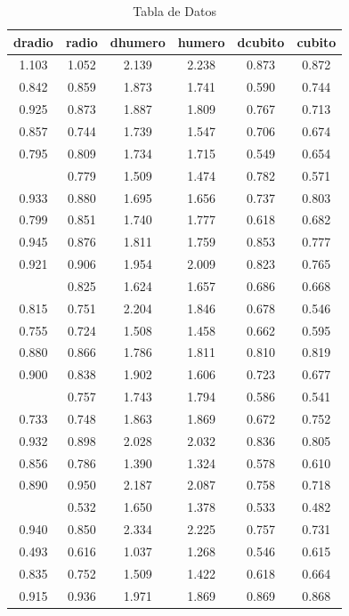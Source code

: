 \documentclass[12pt,a4paper,]{book}
\numberwithin{dummy}{section}
\theoremstyle{ocrenumbox}
\theoremstyle{ocrenumbox}
\theoremstyle{ocrenumbox}
\theoremstyle{ocrenumbox}
\theoremstyle{ocrenum}
\begin{document}
\begin{longtable}[t]{cccccc}
\caption{\label{tab:unnamed-chunk-2}Tabla de Datos}\\
\toprule
dradio & radio & dhumero & humero & dcubito & cubito\\
\midrule
1.103 & 1.052 & 2.139 & 2.238 & 0.873 & 0.872\\
0.842 & 0.859 & 1.873 & 1.741 & 0.590 & 0.744\\
0.925 & 0.873 & 1.887 & 1.809 & 0.767 & 0.713\\
0.857 & 0.744 & 1.739 & 1.547 & 0.706 & 0.674\\
0.795 & 0.809 & 1.734 & 1.715 & 0.549 & 0.654\\
\addlinespace
0.787 & 0.779 & 1.509 & 1.474 & 0.782 & 0.571\\
0.933 & 0.880 & 1.695 & 1.656 & 0.737 & 0.803\\
0.799 & 0.851 & 1.740 & 1.777 & 0.618 & 0.682\\
0.945 & 0.876 & 1.811 & 1.759 & 0.853 & 0.777\\
0.921 & 0.906 & 1.954 & 2.009 & 0.823 & 0.765\\
\addlinespace
0.792 & 0.825 & 1.624 & 1.657 & 0.686 & 0.668\\
0.815 & 0.751 & 2.204 & 1.846 & 0.678 & 0.546\\
0.755 & 0.724 & 1.508 & 1.458 & 0.662 & 0.595\\
0.880 & 0.866 & 1.786 & 1.811 & 0.810 & 0.819\\
0.900 & 0.838 & 1.902 & 1.606 & 0.723 & 0.677\\
\addlinespace
0.764 & 0.757 & 1.743 & 1.794 & 0.586 & 0.541\\
0.733 & 0.748 & 1.863 & 1.869 & 0.672 & 0.752\\
0.932 & 0.898 & 2.028 & 2.032 & 0.836 & 0.805\\
0.856 & 0.786 & 1.390 & 1.324 & 0.578 & 0.610\\
0.890 & 0.950 & 2.187 & 2.087 & 0.758 & 0.718\\
\addlinespace
0.688 & 0.532 & 1.650 & 1.378 & 0.533 & 0.482\\
0.940 & 0.850 & 2.334 & 2.225 & 0.757 & 0.731\\
0.493 & 0.616 & 1.037 & 1.268 & 0.546 & 0.615\\
0.835 & 0.752 & 1.509 & 1.422 & 0.618 & 0.664\\
0.915 & 0.936 & 1.971 & 1.869 & 0.869 & 0.868\\
\bottomrule
\end{longtable}
\endgroup{}
\end{document}
